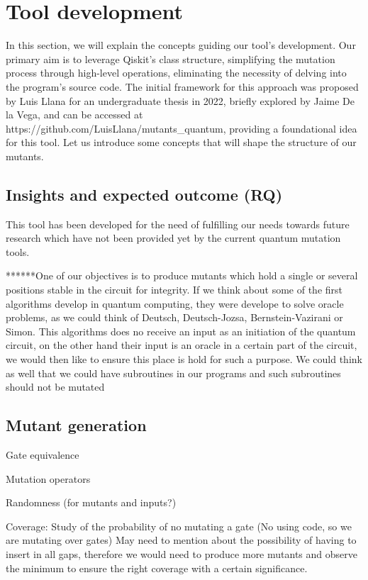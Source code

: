\newpage
\section{Tool development}

In this section, we will explain the concepts guiding our tool's development. Our primary aim is to leverage Qiskit's class structure, simplifying the mutation process through high-level operations, eliminating the necessity of delving into the program's source code. The initial framework for this approach was proposed by Luis Llana for an undergraduate thesis in 2022, briefly explored by Jaime De la Vega, and can be accessed at https://github.com/LuisLlana/mutants\_quantum, providing a foundational idea for this tool. Let us introduce some concepts that will shape the structure of our mutants.\newline

\subsection{Insights and expected outcome (RQ)}

This tool has been developed for the need of fulfilling our needs towards future research which have not been provided yet by the current quantum mutation tools.\newline

******One of our objectives is to produce mutants which hold a single or several positions stable in the circuit for integrity. If we think about some of the first algorithms develop in quantum computing, they were develope to solve oracle problems, as we could think of Deutsch, Deutsch-Jozsa, Bernstein-Vazirani or Simon. This algorithms does no receive an input as an initiation of the quantum circuit, on the other hand their input is an oracle in a certain part of the circuit, we would then like to ensure this place is hold for such a purpose. We could think as well that we could have subroutines in our programs and such subroutines should not be mutated


\subsection{Mutant generation}

Gate equivalence\newline

Mutation operators\newline

Randomness (for mutants and inputs?)\newline

Coverage: Study of the probability of no mutating a gate (No using code, so we are mutating over gates)
        May need to mention about the possibility of having to insert in all gaps, therefore we would need to produce more mutants and observe the minimum to ensure the right coverage with a certain significance.

